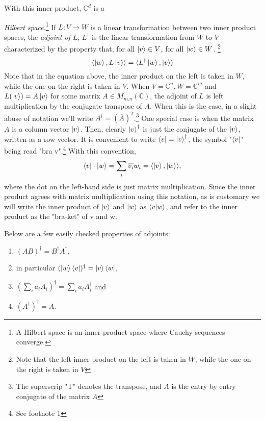 With this inner product, ${\mathbb{C}}^d$ is a {\emph{Hilbert space.}\footnote{A Hilbert space is an inner product space where Cauchy sequences converge.}  If $L:V \to W$ is a linear transformation between two inner product spaces, the {\emph{adjoint of }}$L$, $L^\dagger$ is the linear transformation from $W$ to $V$ characterized by the property that, \textrm{ for all } $\ket{v} \in V$, \textrm{ for all }$\ket{w} \in W$. \footnote{Note that the left inner product on the left is taken in $W$, while the one on the right is taken in $V$}
\begin{equation}
    \langle\ket{w}, L\ket{v}\rangle=\langle L^\dagger \ket{w}, \ket{v}\rangle 
\end{equation}
Note that in the equation above, the inner product on the left is taken in $W$, while the one on the right is taken in $V$.  When $V={\mathbb{C}}^n, W={\mathbb{C}}^m$ and $L(\ket{v})=A\ket{v}$ for some matrix $A \in M_{m.n}(\mathbb{C})$, the adjoint of $L$ is left multiplication by the conjugate transpose of $A$.  When this is the case, in a slight abuse of notation we'll write $A^\dagger=(\overline{A})^T$.\footnote{The superscrip "T" denotes the transpose, and $\overline{A}$ is the entry by entry conjugate of the matrix $A$} One special case is when the matrix $A$ is a column vector $\ket{v}$.  Then, clearly $\ket{v}^\dagger$ is just the conjugate of the $\ket{v}$, written as a row vector.  It is convenient to write $\bra{v}={\ket{v}}^\dagger$, the symbol "$\bra{v}$" being read "bra v".\footnote{See footnote 1}  With this convention,
\begin{equation}
\bra{v}\cdot \ket{w}=\sum_i \overline{v_i}w_i=\langle \ket{v},\ket{w}\rangle,
\end{equation}
where the dot on the left-hand side is just matrix multiplication.  Since the inner product agrees with matrix multiplication using this notation, as is customary we will write the inner product of $\ket{v}$ and $\ket{w}$ as $\braket{v|w}$, and refer to the inner product as the "bra-ket" of v and w.

Below are a few easily checked properties of adjoints:
\begin{enumerate}
    \item $(AB)^\dagger=B^\dagger A^\dagger$,
    \item in particular $(\ket{w}\bra{v})^\dagger=\ket{v}\bra{w}$,
    \item $(\sum_i a_i A_i)^\dagger=\sum_i \overline{a_i} A_i^\dagger$ and 
    \item $(A^\dagger)^\dagger=A$.
\end{enumerate}

}
